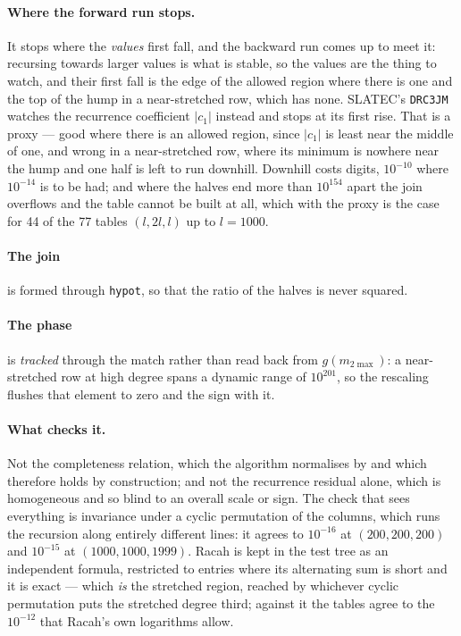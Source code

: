 \documentclass[11pt,a4paper]{article}
\newcommand{\code}[1]{\texttt{#1}}
\begin{document}
\paragraph{Where the forward run stops.}  It stops where the
\emph{values} first fall, and the backward run comes up to meet it:
recursing towards larger values is what is stable, so the values are the
thing to watch, and their first fall is the edge of the allowed region
where there is one and the top of the hump in a near-stretched row, which
has none.  SLATEC's \code{DRC3JM} watches the recurrence coefficient
$|c_1|$ instead and stops at its first rise.  That is a proxy --- good
where there is an allowed region, since $|c_1|$ is least near the middle of
one, and wrong in a near-stretched row, where its minimum is nowhere near
the hump and one half is left to run downhill.  Downhill costs digits,
$10^{-10}$ where $10^{-14}$ is to be had; and where the halves end more
than $10^{154}$ apart the join overflows and the table cannot be built at
all, which with the proxy is the case for 44 of the 77 tables $(l,2l,l)$
up to $l=1000$.

\paragraph{The join} is formed through \code{hypot}, so that the ratio of
the halves is never squared.

\paragraph{The phase} is \emph{tracked} through the match rather than read
back from $g(m_{2\max})$: a near-stretched row at high degree spans a
dynamic range of $10^{201}$, so the rescaling flushes that element to zero
and the sign with it.

\paragraph{What checks it.}  Not the completeness relation, which the
algorithm normalises by and which therefore holds by construction; and not the
recurrence residual alone, which is homogeneous and so blind to an overall
scale or sign.  The check that sees everything is invariance under a cyclic
permutation of the columns, which runs the recursion along entirely different
lines: it agrees to $10^{-16}$ at $(200,200,200)$ and $10^{-15}$ at
$(1000,1000,1999)$.  Racah is kept in the test tree as an independent formula,
restricted to entries where its alternating sum is short and it is exact ---
which \emph{is} the stretched region, reached by whichever cyclic permutation
puts the stretched degree third; against it the tables agree to the
$10^{-12}$ that Racah's own logarithms allow.
\end{document}

